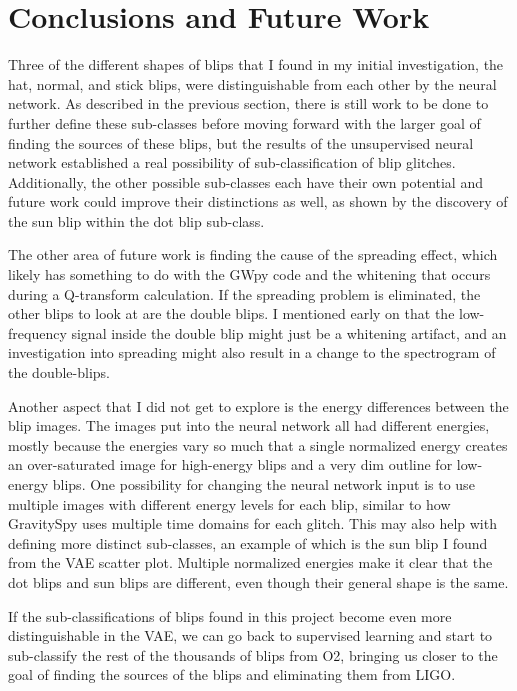 \documentclass[a4paper]{article}
\begin{document}
\section{Conclusions and Future Work}

Three of the different shapes of blips that I found in my initial investigation, the hat, normal, and stick blips, were distinguishable from each other by the neural network. As described in the previous section, there is still work to be done to further define these sub-classes before moving forward with the larger goal of finding the sources of these blips, but the results of the unsupervised neural network established a real possibility of sub-classification of blip glitches. Additionally, the other possible sub-classes each have their own potential and future work could improve their distinctions as well, as shown by the discovery of the sun blip within the dot blip sub-class. 

The other area of future work is finding the cause of the spreading effect, which likely has something to do with the GWpy code and the whitening that occurs during a Q-transform calculation. If the spreading problem is eliminated, the other blips to look at are the double blips. I mentioned early on that the low-frequency signal inside the double blip might just be a whitening artifact, and an investigation into spreading might also result in a change to the spectrogram of the double-blips.

Another aspect that I did not get to explore is the energy differences between the blip images. The images put into the neural network all had different energies, mostly because the energies vary so much that a single normalized energy creates an over-saturated image for high-energy blips and a very dim outline for low-energy blips. One possibility for changing the neural network input is to use multiple images with different energy levels for each blip, similar to how GravitySpy uses multiple time domains for each glitch. This may also help with defining more distinct sub-classes, an example of which is the sun blip I found from the VAE scatter plot. Multiple normalized energies make it clear that the dot blips and sun blips are different, even though their general shape is the same. 

If the sub-classifications of blips found in this project become even more distinguishable in the VAE, we can go back to supervised learning and start to sub-classify the rest of the thousands of blips from O2, bringing us closer to the goal of finding the sources of the blips and eliminating them from LIGO.



\end{document}
